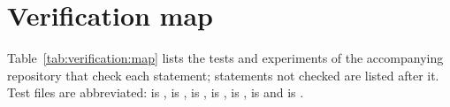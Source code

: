 \section{Verification map}\label{sec:verification}

Table~\ref{tab:verification:map} lists the tests and experiments of the accompanying repository that check each
statement; statements not checked are listed after it. Test files are abbreviated:  is
,  is ,  is ,
 is ,  is ,  is
 and  is .

